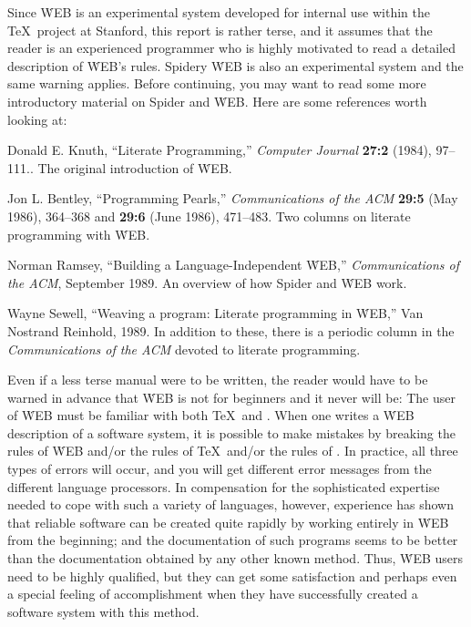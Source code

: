 Since \.{WEB} is an experimental system developed for internal use within
the \TeX\ project at Stanford, this report is rather terse, and it assumes
that the reader is an experienced programmer who is highly motivated to
read a detailed description of \.{WEB}'s rules.
{\newstuff Spidery \.{WEB} is also an experimental system and
the same warning applies.\endnewstuff}
\newstuff
Before continuing, you may want to read some more introductory
material on {Spider} and \.{WEB}.
Here are some references worth looking at:
\itemize
\rm
\item Donald E. Knuth, ``Literate Programming,'' {\sl Computer
Journal} {\bf 27:2} (1984), 97--111..
The original introduction of \.{WEB}.
\item Jon L. Bentley, ``Programming Pearls,'' {\sl Communications of
the ACM} {\bf 29:5} (May 1986), 364--368 and
{\bf 29:6} (June 1986), 471--483.
Two columns on literate programming with \.{WEB}.
\item Norman Ramsey, ``Building a Language-Independent \.{WEB},'' 
{\sl Communications of the ACM}, September 1989.
An overview of how {Spider} and \.{WEB} work.
\item
Wayne Sewell, ``Weaving a program: Literate programming in \.{WEB},''
Van Nostrand Reinhold, 1989.
\enditemize
In addition to these, there is a periodic column in the {\sl
Communications of the ACM} devoted to literate programming.
\endnewstuff

Even if a
less terse manual were to be written, the reader would have to be warned
in advance that \.{WEB} is not for beginners and it never will be: The
user of \.{WEB} must be familiar with both \TeX\ and \PASCAL.
When one
writes a \.{WEB} description of a software system, it is possible to make
mistakes by breaking the rules of \.{WEB} and/or the rules of \TeX\ and/or
the rules of \PASCAL.
In practice, all three types of errors will occur,
and you will get different error messages from the different language
processors.
In compensation for the sophisticated expertise needed to cope
with such a variety of languages, however, experience has shown that
reliable software can be created quite rapidly by working entirely in
\.{WEB} from the beginning; and the documentation of such programs seems
to be better than the documentation obtained by any other known method.
Thus, \.{WEB} users need to be highly qualified, but they can get some
satisfaction and perhaps even a special feeling of accomplishment when
they have successfully created a software system with this method.

